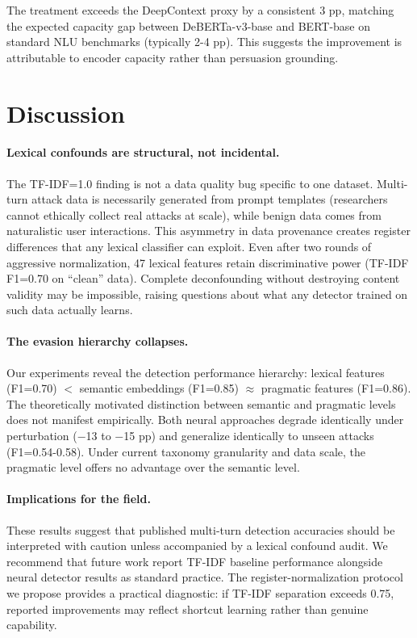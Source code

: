\documentclass[11pt]{article}
\begin{document}
The treatment exceeds the DeepContext proxy by a consistent 3 pp, matching the expected capacity gap between DeBERTa-v3-base and BERT-base on standard NLU benchmarks (typically 2-4 pp). This suggests the improvement is attributable to encoder capacity rather than persuasion grounding.

\section{Discussion}

\paragraph{Lexical confounds are structural, not incidental.}
The TF-IDF=1.0 finding is not a data quality bug specific to one dataset. Multi-turn attack data is necessarily generated from prompt templates (researchers cannot ethically collect real attacks at scale), while benign data comes from naturalistic user interactions. This asymmetry in data provenance creates register differences that any lexical classifier can exploit. Even after two rounds of aggressive normalization, 47 lexical features retain discriminative power (TF-IDF F1=0.70 on ``clean'' data). Complete deconfounding without destroying content validity may be impossible, raising questions about what any detector trained on such data actually learns.

\paragraph{The evasion hierarchy collapses.}
Our experiments reveal the detection performance hierarchy: lexical features (F1=0.70) $<$ semantic embeddings (F1=0.85) $\approx$ pragmatic features (F1=0.86). The theoretically motivated distinction between semantic and pragmatic levels does not manifest empirically. Both neural approaches degrade identically under perturbation ($-$13 to $-$15 pp) and generalize identically to unseen attacks (F1=0.54-0.58). Under current taxonomy granularity and data scale, the pragmatic level offers no advantage over the semantic level.

\paragraph{Implications for the field.}
These results suggest that published multi-turn detection accuracies should be interpreted with caution unless accompanied by a lexical confound audit. We recommend that future work report TF-IDF baseline performance alongside neural detector results as standard practice. The register-normalization protocol we propose provides a practical diagnostic: if TF-IDF separation exceeds 0.75, reported improvements may reflect shortcut learning rather than genuine capability.
\end{document}
